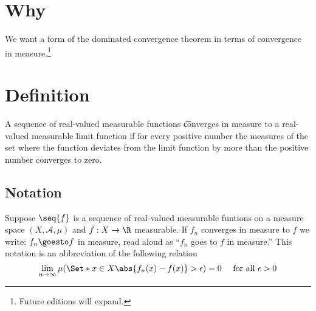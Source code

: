 
\section*{Why}

We want a form of the dominated convergence theorem in terms of convergence in measure.\footnote{Future editions will expand.}

\section*{Definition}

A sequence of real-valued measurable functions \t{converges in measure} to a real-valued measurable limit function if for every positive number the measures of the set where the function deviates from the limit function by more than the positive number converges to zero.

\subsection*{Notation}

Suppose $\seq{f}$ is a sequence of real-valued measurable funtions on a measure space $(X, \mathcal{A} , \mu )$ and $f: X \to \R $ measurable.
If $f_n$ converges in measure to $f$ we write: $f_n \goesto f$ in measure, read aloud as ``$f_n$ goes to $f$ in measure.''
This notation is an abbreviation of the following relation
\[
\lim_{n \to \infty} \mu (\Set*{x \in X}{\abs{f_n(x) - f(x)} > \epsilon }) = 0 \quad \text{ for all } \epsilon  > 0
\]

\blankpage